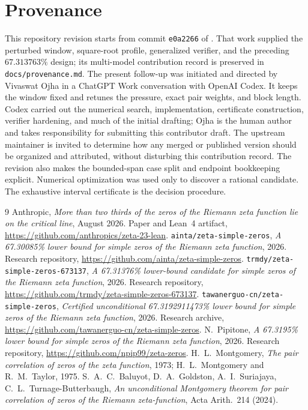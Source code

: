 \documentclass[11pt]{article}
\theoremstyle{remark}
\begin{document}
\section{Provenance}\label{app:provenance}

This repository revision starts from commit \texttt{e0a2266} of
\cite{Trmdy2026}.  That work supplied the perturbed window, square-root
profile, generalized verifier, and the preceding $67.313763\%$ design; its
multi-model contribution record is preserved in \texttt{docs/provenance.md}.
The present follow-up was initiated and directed by Vivaswat Ojha in a
ChatGPT Work conversation with OpenAI Codex.  It keeps the window fixed and
retunes the pressure, exact pair weights, and block length.  Codex carried out
the numerical search, implementation, certificate construction, verifier
hardening, and much of the initial drafting; Ojha is the human author and
takes responsibility for submitting this contributor draft.  The upstream
maintainer is invited to determine how any merged or published version should
be organized and attributed, without disturbing this contribution record.
The revision also makes the bounded-span case split and endpoint bookkeeping explicit.
Numerical optimization was used only to discover a rational candidate.  The
exhaustive interval certificate is the decision procedure.

\begin{thebibliography}{9}
 Anthropic,
\emph{More than two thirds of the zeros of the Riemann zeta function lie on
the critical line}, August 2026.  Paper and Lean~4 artifact,
\url{https://github.com/anthropics/zeta-23-lean}.
 \texttt{ainta/zeta-simple-zeros},
\emph{A 67.30085\% lower bound for simple zeros of the Riemann zeta
function}, 2026.  Research repository,
\url{https://github.com/ainta/zeta-simple-zeros}.
 \texttt{trmdy/zeta-simple-zeros-673137},
\emph{A 67.31376\% lower-bound candidate for simple zeros of the Riemann
zeta function}, 2026.  Research repository,
\url{https://github.com/trmdy/zeta-simple-zeros-673137}.
 \texttt{tawanerguo-cn/zeta-simple-zeros},
\emph{Certified unconditional 67.3192911473\% lower bound for simple zeros
of the Riemann zeta function}, 2026.  Research archive,
\url{https://github.com/tawanerguo-cn/zeta-simple-zeros}.
 N.~Pipitone,
\emph{A 67.3195\% lower bound for simple zeros of the Riemann zeta
function}, 2026.  Research repository,
\url{https://github.com/npip99/zeta-zeros}.
 H.~L.~Montgomery, \emph{The pair correlation of zeros of the
zeta function}, 1973; H.~L.~Montgomery and R.~M.~Taylor, 1975.
 S.~A.~C.~Baluyot, D.~A.~Goldston, A.~I.~Suriajaya,
C.~L.~Turnage-Butterbaugh, \emph{An unconditional Montgomery theorem for
pair correlation of zeros of the Riemann zeta-function}, Acta Arith.\ 214
(2024).
\end{thebibliography}
\end{document}

